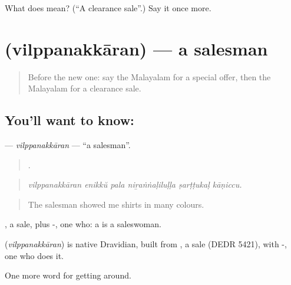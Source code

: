 \begin{tcolorbox}[breakable,colback=teal!4,colframe=teal!35!black,title={Before you move on}]
What does  mean? (\textquotedblleft{}A clearance sale\textquotedblright{}.) Say it once more.
\end{tcolorbox}
\section[\texorpdfstring{\ml{വിൽപ്പനക്കാരൻ} (vilppanakkāran)}{വിൽപ്പനക്കാരൻ (vilppanakkāran)}]{ (vilppanakkāran) — a salesman}

\label{lesson:ML-C491-vilppanakkaran}



\begin{quote}
Before the new one: say the Malayalam for a special offer, then the Malayalam for a clearance sale.
\end{quote}

\subsection*{You'll want to know: }
\textbf{} — \emph{vilppanakkāran} — \textquotedblleft{}a salesman\textquotedblright{}.

\begin{quote}
     .
\end{quote}

\begin{quote}
\emph{vilppanakkāran enikkŭ pala niṟaṅṅaḷiluḷḷa ṣarṭṭukaḷ kāṇiccu.}
\end{quote}

\begin{quote}
The salesman showed me shirts in many colours.
\end{quote}

, a sale, plus -, one who: a  is a saleswoman.

\begin{cousinweb}
\textbf{} (\emph{vilppanakkāran}) is native Dravidian, built from , a sale (DEDR 5421), with -, one who does it.
\end{cousinweb}

\begin{grammarlens}[title={What you've built}]
One more word for getting around.
\end{grammarlens}

